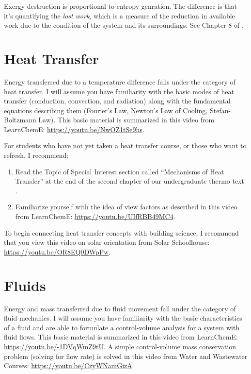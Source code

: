 \documentclass[10pt]{article}
\begin{document}
Exergy destruction is proportional to entropy genration. The difference is that it's quantifying the \textit{lost work}, which is a measure of the reduction in available work due to the condition of the system and its surroundings. See Chapter 8 of \cite{cengel}.

\section{Heat Transfer}

Energy transferred due to a temperature difference falls under the category of heat transfer. I will assume you have familiarity with the basic modes of heat transfer (conduction, convection, and radiation) along with the fundamental equations describing them (Fourier's Law, Newton's Law of Cooling, Stefan-Boltzmann Law). This basic material is summarized in this video from LearnChemE: \url{https://youtu.be/NwOZ1tSe9hs}.

For students who have not yet taken a heat transfer course, or those who want to refresh, I recommend:

\begin{enumerate}
\item Read the Topic of Special Interest section called ``Mechanisms of Heat Transfer'' at the end of the second chapter of our undergraduate thermo text \cite{cengel}. 
\item Familiarize yourself with the idea of view factors as described in this video from LearnChemE: \url{https://youtu.be/UIfRBB49MC4}.
\end{enumerate}

To begin connecting heat transfer concepts with building science, I recommend that you view this video on solar orientation from Solar Schoolhouse: \url{https://youtu.be/OR8EQ0DWpPw}.

\section{Fluids}

Energy and mass transferred due to fluid movement fall under the category of fluid mechanics. I will assume you have familiarity with the basic characteristics of a fluid and are able to formulate a control-volume analysis for a system with fluid flows. This basic material is summarized in this video from LearnChemE: \url{https://youtu.be/-1DVqWmZ9tU}. A simple  control-volume mass conservation problem (solving for flow rate) is solved in this video from 
Water and Wastewater Courses: \url{https://youtu.be/CzyWNamGizA}.
\end{document}
